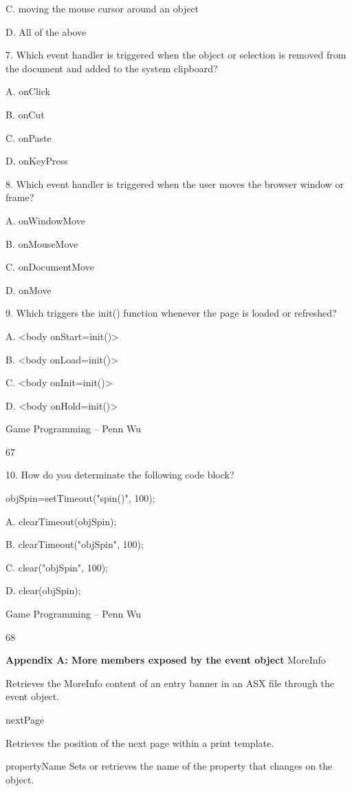\documentclass[
]{article}
\begin{document}
C. moving the mouse cursor around an object

D. All of the above

7. Which event handler is triggered when the object or selection is
removed from the document and added to the system clipboard?

A. onClick

B. onCut

C. onPaste

D. onKeyPress

8. Which event handler is triggered when the user moves the browser
window or frame?

A. onWindowMove

B. onMouseMove

C. onDocumentMove

D. onMove

9. Which triggers the init() function whenever the page is loaded or
refreshed?

A. \textless body onStart=init()\textgreater{}

B. \textless body onLoad=init()\textgreater{}

C. \textless body onInit=init()\textgreater{}

D. \textless body onHold=init()\textgreater{}

Game Programming -- Penn Wu

67

\protect\hypertarget{index_split_005.htmlux5cux23p68}{}{}

10. How do you determinate the following code block?

objSpin=setTimeout("spin()", 100);

A. clearTimeout(objSpin);

B. clearTimeout("objSpin", 100);

C. clear("objSpin", 100);

D. clear(objSpin);

Game Programming -- Penn Wu

68

\protect\hypertarget{index_split_005.htmlux5cux23p69}{}{}\textbf{Appendix
A: More members exposed by the event object} MoreInfo

Retrieves the MoreInfo content of an entry banner in an ASX file through
the event object.

nextPage

Retrieves the position of the next page within a print template.

propertyName Sets or retrieves the name of the property that changes on
the object.
\end{document}
